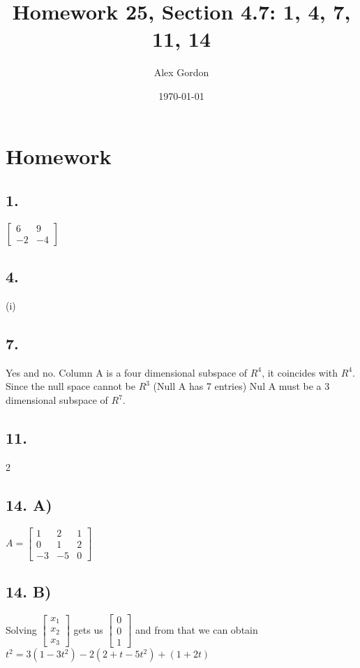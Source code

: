 \documentclass[12]{scrartcl}
\begin{document}
\title{Homework 25, Section 4.7: 1, 4, 7, 11, 14}
\author{Alex Gordon}
\date{\today}
\maketitle
\section*{Homework}
\subsection*{1.}
$\begin{bmatrix}  6 & 9 \\ -2 & -4  \end{bmatrix} $
\subsection*{4.}
(i)
\subsection*{7.}
Yes and no. Column A is a four dimensional subspace of $R^4$, it coincides with $R^4$. Since the null space cannot be $R^3$ (Null A has 7 entries) Nul A must be a 3 dimensional subspace of $R^7$. 
\subsection*{11.}
2
\subsection*{14. A)}
$A = \begin{bmatrix}  1 & 2 & 1 \\ 0 & 1 & 2 \\ -3 & -5 & 0  \end{bmatrix} $
\subsection*{14. B)}
Solving $ \begin{bmatrix}  x_1 \\ x_2 \\ x_3  \end{bmatrix} $ gets us $ \begin{bmatrix}  0 \\ 0 \\ 1  \end{bmatrix} $ and from that we can obtain $t^2 = 3(1 - 3t^2) - 2(2 + t - 5t^2) + ( 1 + 2t)$
\end{document}

